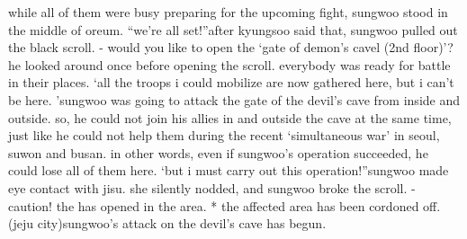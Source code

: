 while all of them were busy preparing for the upcoming fight, sungwoo stood in the middle of oreum.
“we’re all set!”after kyungsoo said that, sungwoo pulled out the black scroll.
- would you like to open the ‘gate of demon’s cavel (2nd floor)’?he looked around once before opening the scroll.
 everybody was ready for battle in their places.
‘all the troops i could mobilize are now gathered here, but i can’t be here.
’sungwoo was going to attack the gate of the devil’s cave from inside and outside.
 so, he could not join his allies in and outside the cave at the same time, just like he could not help them during the recent ‘simultaneous war’ in seoul, suwon and busan.
in other words, even if sungwoo’s operation succeeded, he could lose all of them here.
‘but i must carry out this operation!”sungwoo made eye contact with jisu.
 she silently nodded, and sungwoo broke the scroll.
- caution! the  has opened in the area.
* the affected area has been cordoned off.
 (jeju city)sungwoo’s attack on the devil’s cave has begun.


 